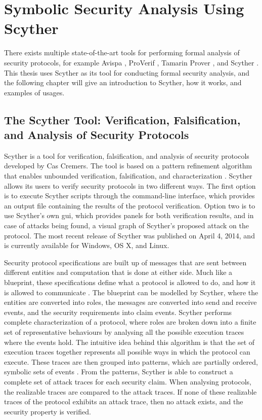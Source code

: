 \chapter{Symbolic Security Analysis Using Scyther}
\label{chp:scyther} 


There exists multiple state-of-the-art tools for performing formal analysis of security protocols, for example Avispa \cite{avispa}, ProVerif \cite{proverif}, Tamarin Prover \cite{meier2013tamarin}, and Scyther \cite{scyther}. This thesis uses Scyther as its tool for conducting formal security analysis, and the following chapter will give an introduction to Scyther, how it works, and examples of usages.


\section{The Scyther Tool: Verification, Falsification, and Analysis of Security Protocols}

Scyther is a tool for verification, falsification, and analysis of security protocols developed by Cas Cremers. The tool is based on a pattern refinement algorithm that enables unbounded verification, falsification, and characterization \cite{cremers2008scyther}. Scyther allows its users to verify security protocols in two different ways. The first option is to execute Scyther scripts through the command-line interface, which provides an output file containing the results of the protocol verification. Option two is to use Scyther's own \gls{gui}, which provides panels for both verification results, and in case of attacks being found, a visual graph of Scyther's proposed attack on the protocol. The most recent release of Scyther was published on April 4, 2014, and is currently available for Windows, OS X, and Linux.


Security protocol specifications are built up of messages that are sent between different entities and computation that is done at either side. Much like a blueprint, these specifications define what a protocol is allowed to do, and how it is allowed to communicate \cite{cremers2003defining}. The blueprint can be modelled by Scyther, where the entities are converted into roles, the messages are converted into send and receive events, and the security requirements into claim events. Scyther performs complete characterization of a protocol, where roles are broken down into a finite set of representative behaviours by analysing all the possible execution traces where the events hold. The intuitive idea behind this algorithm is that the set of execution traces together represents all possible ways in which the protocol can execute. These traces are then grouped into patterns, which are partially ordered, symbolic sets of events \cite{cremers2006scyther}. From the patterns, Scyther is able to construct a complete set of attack traces for each security claim. When analysing protocols, the realizable traces are compared to the attack traces. If none of these realizable traces of the protocol exhibits an attack trace, then no attack exists, and the security property is verified. 

